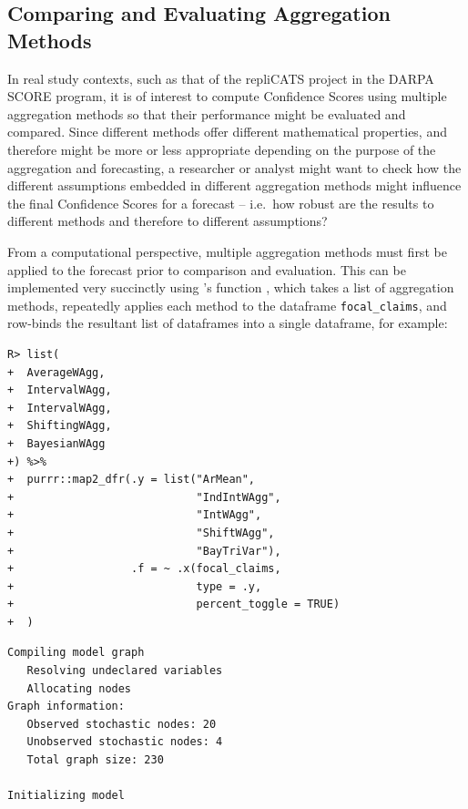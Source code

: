 \documentclass[article]{jss}
\newcommand{\fct}[1]{\code{#1()}}
\begin{document}
\hypertarget{comparing-and-evaluating-aggregation-methods}{%
\subsection{Comparing and Evaluating Aggregation
Methods}\label{comparing-and-evaluating-aggregation-methods}}

In real study contexts, such as that of the repliCATS project in the
DARPA SCORE program, it is of interest to compute Confidence Scores
using multiple aggregation methods so that their performance might be
evaluated and compared. Since different methods offer different
mathematical properties, and therefore might be more or less appropriate
depending on the purpose of the aggregation and forecasting, a
researcher or analyst might want to check how the different assumptions
embedded in different aggregation methods might influence the final
Confidence Scores for a forecast -- i.e.~how robust are the results to
different methods and therefore to different assumptions?

From a computational perspective, multiple aggregation methods must
first be applied to the forecast prior to comparison and evaluation.
This can be implemented very succinctly using 's
\fct{map\_dfr} function \citep{purrr2020} , which takes a list of
aggregation methods, repeatedly applies each method to the dataframe
\texttt{focal\_claims}, and row-binds the resultant list of dataframes
into a single dataframe, for example:

\begin{verbatim}
R> list(
+  AverageWAgg,
+  IntervalWAgg,
+  IntervalWAgg,
+  ShiftingWAgg,
+  BayesianWAgg
+) %>%
+  purrr::map2_dfr(.y = list("ArMean", 
+                            "IndIntWAgg", 
+                            "IntWAgg", 
+                            "ShiftWAgg", 
+                            "BayTriVar"),
+                  .f = ~ .x(focal_claims, 
+                            type = .y, 
+                            percent_toggle = TRUE)
+  )
\end{verbatim}

\begin{verbatim}
Compiling model graph
   Resolving undeclared variables
   Allocating nodes
Graph information:
   Observed stochastic nodes: 20
   Unobserved stochastic nodes: 4
   Total graph size: 230

Initializing model
\end{verbatim}
\end{document}
